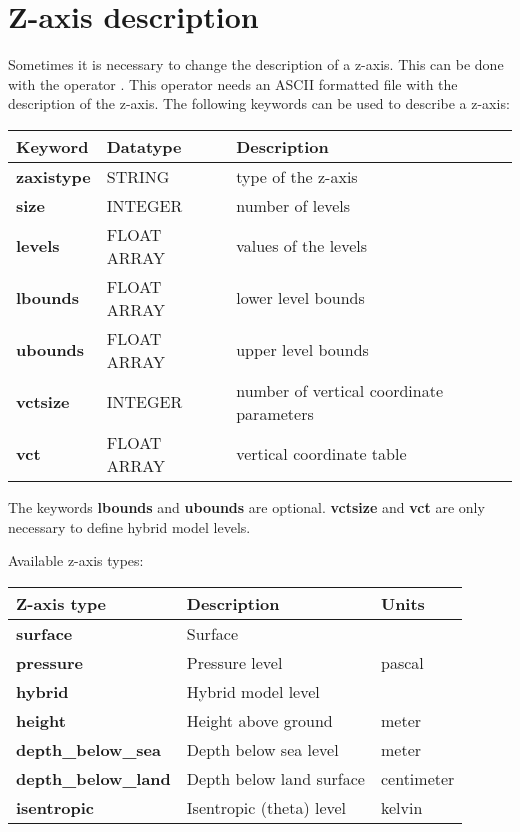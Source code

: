 \section{Z-axis description}

Sometimes it is necessary to change the description of a z-axis.
This can be done with the operator .
This operator needs an ASCII formatted file with the description
of the z-axis.
The following keywords can be used to describe a z-axis:

\vspace{3mm}
\begin{tabular}[b]{lll}
Keyword          & Datatype     & Description \\ \hline
\textbf{zaxistype}  & STRING       & type of the z-axis   \\
\textbf{size}       & INTEGER      & number of levels     \\
\textbf{levels}     & FLOAT ARRAY  & values of the levels \\
\textbf{lbounds}    & FLOAT ARRAY  & lower level bounds \\
\textbf{ubounds}    & FLOAT ARRAY  & upper level bounds \\
\textbf{vctsize}    & INTEGER      & number of vertical coordinate parameters \\
\textbf{vct}        & FLOAT ARRAY  & vertical coordinate table \\
\end{tabular}
\vspace{3mm}

The keywords \textbf{lbounds} and \textbf{ubounds} are optional. \textbf{vctsize} and \textbf{vct} are only
necessary to define hybrid model levels.


Available z-axis types:

\vspace{3mm}
\begin{tabular}[b]{lll}
Z-axis type              & Description              &  Units        \\ \hline   
\textbf{surface}            & Surface                  &               \\
\textbf{pressure}           & Pressure level           &  pascal       \\
\textbf{hybrid}             & Hybrid model level       &               \\
\textbf{height}             & Height above ground      &  meter        \\
\textbf{depth\_below\_sea}  & Depth below sea level    &  meter        \\
\textbf{depth\_below\_land} & Depth below land surface &  centimeter   \\
\textbf{isentropic}         & Isentropic (theta) level &  kelvin       \\
\end{tabular}
\vspace{3mm}

